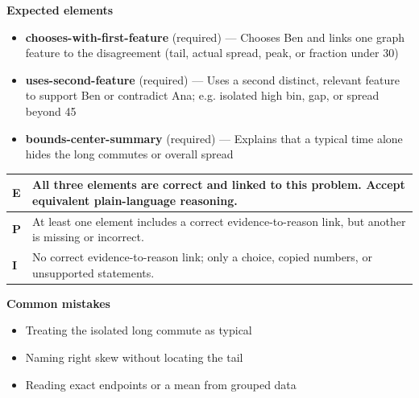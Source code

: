 \documentclass[11pt]{article}
\begin{document}
\textbf{Expected elements}
\begin{itemize}[leftmargin=1.5em,itemsep=2pt,topsep=2pt]
  \item \textbf{chooses-with-first-feature} (required) --- Chooses Ben and links one graph feature to the disagreement (tail, actual spread, peak, or fraction under 30)
  \item \textbf{uses-second-feature} (required) --- Uses a second distinct, relevant feature to support Ben or contradict Ana; e.g. isolated high bin, gap, or spread beyond 45
  \item \textbf{bounds-center-summary} (required) --- Explains that a typical time alone hides the long commutes or overall spread
\end{itemize}

{\small\renewcommand{\arraystretch}{1.25}
\noindent\begin{tabular}{|p{0.5in}|p{5.9in}|}
\hline
\textbf{E} & All three elements are correct and linked to this problem. Accept equivalent plain-language reasoning. \\ \hline
\textbf{P} & At least one element includes a correct evidence-to-reason link, but another is missing or incorrect. \\ \hline
\textbf{I} & No correct evidence-to-reason link; only a choice, copied numbers, or unsupported statements. \\ \hline
\end{tabular}}

\textbf{Common mistakes}
\begin{itemize}[leftmargin=1.5em,itemsep=2pt,topsep=2pt]
  \item Treating the isolated long commute as typical
  \item Naming right skew without locating the tail
  \item Reading exact endpoints or a mean from grouped data
\end{itemize}


\clearpage
{}
\end{document}
